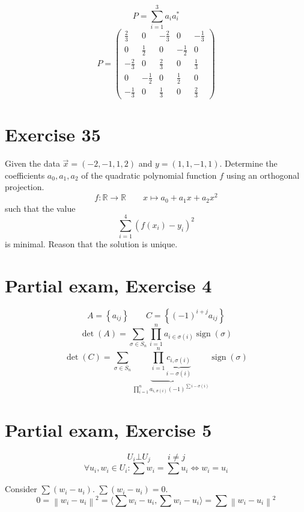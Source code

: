 \documentclass[a4paper]{article}
\theoremstyle{definition}
\newcommand\set[1]{\left\{#1\right\}}
\newcommand\ip[2]{\langle{#1},{#2}\rangle}
\newcommand\norm[1]{\left\|{#1}\right\|}
\begin{document}
\[ P = \sum_{i=1}^3 a_i a_i^* \]
\[
  P = \begin{pmatrix}
    \frac23 & 0 & -\frac23 & 0 & -\frac13 \\
    0 & \frac12 & 0 & -\frac12 & 0 \\
    -\frac23 & 0 & \frac23 & 0 & \frac13 \\
    0 & -\frac12 & 0 & \frac12 & 0 \\
    -\frac13 & 0 &\frac13 & 0 & \frac23
  \end{pmatrix}
\]


\section*{Exercise 35}
\begin{ex}
  Given the data $\vec x = (-2, -1, 1, 2)$ and $y = (1,1,-1, 1)$. Determine the coefficients $a_0, a_1, a_2$ of the quadratic polynomial function $f$ using an orthogonal projection.
  \[ f: \mathbb R \to \mathbb R \qquad x \mapsto a_0 + a_1 x + a_2 x^2 \]
  such that the value
  \[ \sum_{i=1}^4 (f(x_i) - y_i)^2 \]
  is minimal. Reason that the solution is unique.
\end{ex}

\section*{Partial exam, Exercise 4}

\[ A= \set{a_{ij}} \qquad C = \set{(-1)^{i+j}a_{ij}} \]
\[ \det(A) = \sum_{\sigma \in S_n} \prod_{i=1}^n a_{i \in \sigma(i)} \operatorname{sign}(\sigma) \]
\[ \det(C) = \sum_{\sigma \in S_n} \underbrace{\prod_{i=1}^n \underbrace{c_{i,\sigma(i)}}_{i-\sigma(i)}}_{\prod_{i=1}^n a_{i,\sigma(i)} (-1)^{\sum i - \sigma(i)}} \operatorname{sign}(\sigma) \]

\section*{Partial exam, Exercise 5}

\[ U_i \bot U_j \qquad i \neq j \]
\[ \forall u_i, w_i \in U_i: \sum w_i = \sum u_i \iff w_i = u_i \]

Consider $\sum (w_i - u_i)$. $\sum (w_i - u_i) = 0$.
\[ 0 = \norm{w_i - u_i}^2 = \ip{\sum w_i - u_i}{\sum w_i - u_i} = \sum \norm{w_i - u_i}^2 \]
\end{document}
